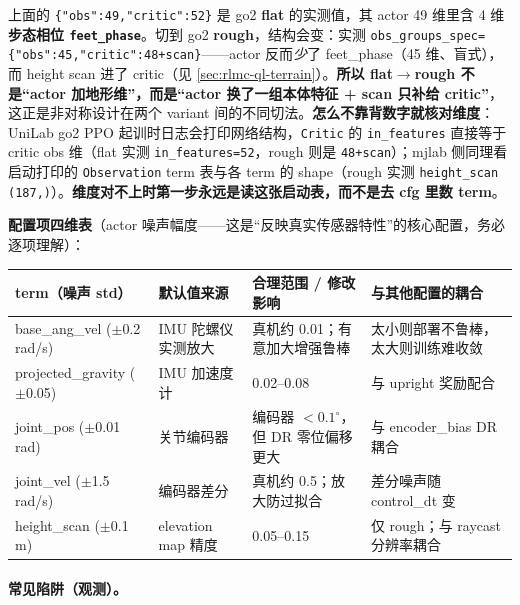\begin{note}
上面的 \verb|{"obs":49,"critic":52}| 是 go2 \textbf{flat} 的实测值，其 actor 49 维里含 4 维\textbf{步态相位 \texttt{feet\_phase}}。切到 go2 \textbf{rough}，结构会变：实测 \verb|obs_groups_spec={"obs":45,"critic":48+scan}|——actor 反而\emph{少}了 feet\_phase（45 维、盲式），而 height scan 进了 critic（见 \cref{sec:rlmc-ql-terrain}）。\textbf{所以 flat$\to$rough 不是“actor 加地形维”，而是“actor 换了一组本体特征 + scan 只补给 critic”}，这正是非对称设计在两个 variant 间的不同切法。\textbf{怎么不靠背数字就核对维度}：UniLab go2 PPO 起训时日志会打印网络结构，\verb|Critic| 的 \verb|in_features| 直接等于 critic obs 维（flat 实测 \verb|in_features=52|，rough 则是 \verb|48+scan|）；mjlab 侧同理看启动打印的 \verb|Observation| term 表与各 term 的 shape（rough 实测 \verb|height_scan (187,)|）。\textbf{维度对不上时第一步永远是读这张启动表，而不是去 cfg 里数 term}。
\end{note}

\textbf{配置项四维表}（actor 噪声幅度——这是“反映真实传感器特性”的核心配置，务必逐项理解）：

\begin{center}
\small
\begin{tabular}{@{}lllp{4.6cm}@{}}
\toprule
term（噪声 std） & 默认值来源 & 合理范围 / 修改影响 & 与其他配置的耦合 \\
\midrule
base\_ang\_vel ($\pm$0.2 rad/s) & IMU 陀螺仪实测放大 & 真机约 0.01；有意加大增强鲁棒 & 太小则部署不鲁棒，太大则训练难收敛 \\
projected\_gravity ($\pm$0.05) & IMU 加速度计 & 0.02--0.08 & 与 upright 奖励配合 \\
joint\_pos ($\pm$0.01 rad) & 关节编码器 & 编码器 $<0.1^\circ$，但 DR 零位偏移更大 & 与 encoder\_bias DR 耦合 \\
joint\_vel ($\pm$1.5 rad/s) & 编码器差分 & 真机约 0.5；放大防过拟合 & 差分噪声随 control\_dt 变 \\
height\_scan ($\pm$0.1 m) & elevation map 精度 & 0.05--0.15 & 仅 rough；与 raycast 分辨率耦合 \\
\bottomrule
\end{tabular}
\end{center}

\paragraph{常见陷阱（观测）。}

